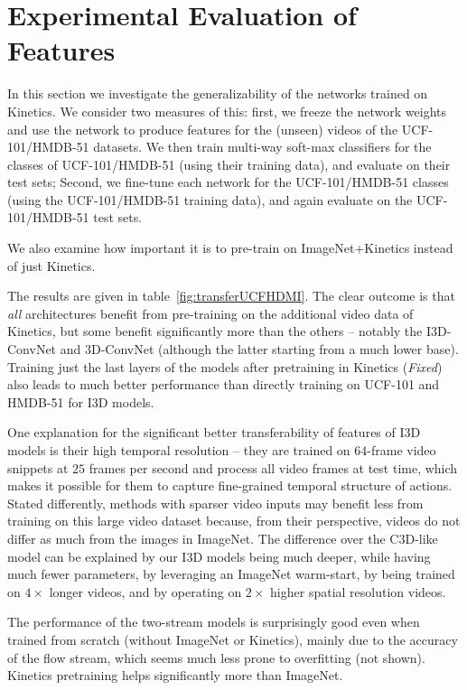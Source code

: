 \documentclass[10pt,twocolumn,letterpaper]{article}
\begin{document}
\section{Experimental Evaluation of Features \label{comp_feat}}


In this section we investigate the generalizability of the networks trained on Kinetics. We consider two measures of this: first, we freeze the network weights and use the network to produce features for the (unseen) videos of the UCF-101/HMDB-51 datasets. We then train multi-way soft-max classifiers for the classes of UCF-101/HMDB-51 (using their training data), and evaluate on their test sets; Second, we fine-tune each network for the UCF-101/HMDB-51
classes (using the UCF-101/HMDB-51 training data), and again evaluate on the UCF-101/HMDB-51 test sets.

We also examine how important it is to pre-train on ImageNet+Kinetics instead of just Kinetics. 

The results are given in table~\ref{fig:transferUCFHDMI}. The clear
outcome is that {\em all} architectures benefit from pre-training on
the additional video data of Kinetics, but some benefit
significantly more than the others -- notably the I3D-ConvNet and
3D-ConvNet (although the latter starting from a much lower base). Training just the last layers of the models after pretraining in Kinetics (\textit{Fixed}) also leads to much better performance than directly training on  UCF-101 and HMDB-51 for I3D models.

One explanation for the significant better transferability of features of I3D models is their high temporal resolution -- they are trained on $64$-frame video snippets at $25$ frames per second and process all video frames at test time, which makes it possible for them to capture fine-grained temporal structure of actions. Stated differently, methods with sparser video inputs  may benefit less from training on this large video dataset because, from their perspective, videos do not differ as much from the images in ImageNet. The difference over the C3D-like model can be explained by our I3D models being much deeper, while having much fewer parameters, by leveraging an ImageNet warm-start, by being trained on $4\times $ longer videos, and by operating on $2\times$ higher spatial resolution videos.

The performance of the two-stream  models is surprisingly good even when trained from scratch  (without ImageNet or Kinetics),  mainly due to the accuracy of the flow stream, which seems much less prone to overfitting (not shown). Kinetics pretraining helps significantly more than ImageNet.
\end{document}
